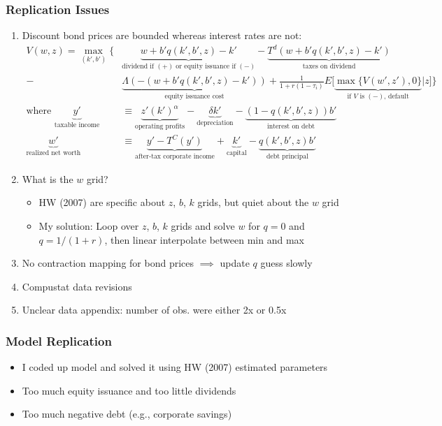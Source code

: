 \documentclass[usenames,dvipsnames, handout]{beamer}
\begin{document}
\begin{frame}
\frametitle{Replication Issues}
\scriptsize
\begin{enumerate}
\item Discount bond prices are bounded whereas interest rates are not:
\scriptsize
\begin{align*}
V(w, z) =
\max_{(k', b')} \Bigg\{ 
& \underbrace{w + b'q(k',b',z) - k'}_{\text{dividend if } (+) \text{ or equity issuance if } (-)} - \underbrace{T^d(w + b'q(k',b',z) - k')}_{\text{taxes on dividend}} \\
- &\underbrace{\Lambda(-(w + b'q(k',b',z) - k'))}_{\text{equity issuance cost}} + \frac{1}{1+r(1-\tau_i)} E\Big[\underbrace{\max\{ V(w', z'), 0\}}_{\text{if }V \text{ is } (-) \text{, default}}| z\Big] \Bigg\} \\
\text{where }
\underbrace{y'}_{\text{taxable income}} &\equiv \underbrace{z' (k')^\alpha}_{\text{operating profits}} - \underbrace{\delta k'}_{\text{depreciation}} - \underbrace{(1-q(k',b',z)) b'}_{\text{interest on debt}} \\
\underbrace{w'}_{\text{realized net worth}} &\equiv \underbrace{y' - T^C(y')}_{\text{after-tax corporate income}}+ \underbrace{k'}_{\text{capital}}  - \underbrace{q(k',b',z)b'}_{\text{debt principal}}
\end{align*}
\small
\item What is the $w$ grid?
\begin{itemize}
\scriptsize
\item HW (2007) are specific about $z$, $b$, $k$ grids, but quiet about the $w$ grid
\item My solution: Loop over $z$, $b$, $k$ grids and solve $w$ for $q = 0$ and $q = 1/(1+r)$, then linear interpolate between min and max
\end{itemize}
\item No contraction mapping for bond prices $\implies$ update $q$ guess slowly
\item Compustat data revisions
\item Unclear data appendix: number of obs. were either 2x or 0.5x
\end{enumerate}
\end{frame}



\begin{frame}
\frametitle{Model Replication}
\small
\begin{itemize}
\item I coded up model and solved it using HW (2007) estimated parameters
\end{itemize}
\scriptsize
\begin{center}
\end{center}
\small
\begin{itemize}
\item Too much equity issuance and too little dividends
\item Too much negative debt (e.g., corporate savings)
\end{itemize}
\end{frame}
\end{document}
